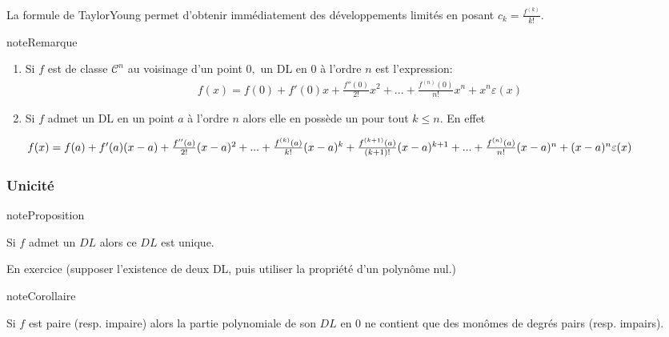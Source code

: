 \documentclass[letterpaper,10pt,french]{jupyterBook}
\begin{document}
\sphinxAtStartPar
La formule de Taylor\sphinxhyphen{}Young permet d’obtenir immédiatement des développements limités en posant \(c_k=\frac{f^{(k)}}{k!}.\)

\begin{sphinxadmonition}{note}{Remarque}
\begin{enumerate}
%
\item {} 
\sphinxAtStartPar
Si \(f\) est de classe \(\mathscr{C}^{n}\) au voisinage d’un point \(0,\) un DL en \(0\) à l’ordre \(n\) est l’expression:
\begin{equation*}
\begin{split}
    f(x)=f(0)+f'(0)x+\frac{f''(0)}{2!}x^2+...+\frac{f^{(n)}(0)}{n!}x^n+x^n \varepsilon(x)
    \end{split}
\end{equation*}
\item {} 
\sphinxAtStartPar
Si \(f\) admet un DL en un point \(a\) à l’ordre \(n\) alors elle en possède un pour tout \(k\leq n.\) En effet

\sphinxAtStartPar
\(f(x)=f(a)+f'(a)(x-a)+\frac{f''(a)}{2!}(x-a)^2+...+\frac{f^{(k)}(a)}{k!}(x-a)^k\\
 +\frac{f^{(k+1)}(a)}{(k+1)!}(x-a)^{k+1}+...+\frac{f^{(n)}(a)}{n!}(x-a)^n+(x-a)^n \varepsilon(x)\)

\end{enumerate}
\end{sphinxadmonition}


\subsubsection{Unicité}
\label{\detokenize{dl:unicite}}
\begin{sphinxadmonition}{note}{Proposition}

\sphinxAtStartPar
Si \(f\) admet un \(DL\) alors ce \(DL\) est unique.
\end{sphinxadmonition}

\sphinxAtStartPar
{} En exercice (supposer l’existence de deux DL, puis utiliser la propriété d’un polynôme nul.)

\begin{sphinxadmonition}{note}{Corollaire}

\sphinxAtStartPar
Si \(f\) est paire (resp. impaire) alors la partie polynomiale de son \(DL\) en \(0\) ne contient que des monômes de degrés pairs
(resp. impairs).
\end{sphinxadmonition}
\end{document}
